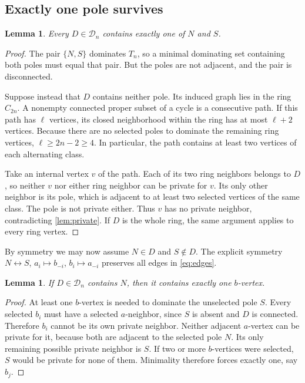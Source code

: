 \documentclass[11pt,letterpaper]{article}
\numberwithin{equation}{section}
\newtheorem{lemma}[theorem]{Lemma}
\theoremstyle{definition}
\newcommand{\CM}{\mathcal D}
\newcommand{\1}{\mathbf 1}
\begin{document}
\subsection{Exactly one pole survives}
\begin{lemma}\label{lem:onepole}
Every $D\in\CM_n$ contains exactly one of $N$ and $S$.
\end{lemma}
\begin{proof}
The pair $\{N,S\}$ dominates $T_n$, so a minimal dominating set containing
both poles must equal that pair. But the poles are not adjacent, and the pair
is disconnected.

Suppose instead that $D$ contains neither pole. Its induced graph lies in the
ring $C_{2n}$. A nonempty connected proper subset of a cycle is a consecutive
path. If this path has $\ell$ vertices, its closed neighborhood within the ring
has at most $\ell+2$ vertices. Because there are no selected poles to dominate
the remaining ring vertices, $\ell\ge2n-2\ge4$. In particular, the path contains
at least two vertices of each alternating class.

Take an internal vertex $v$ of the path. Each of its two ring neighbors belongs
to $D$, so neither $v$ nor either ring neighbor can be private for $v$. Its only
other neighbor is its pole, which is adjacent to at least two selected vertices
of the same class. The pole is not private either. Thus $v$ has no private
neighbor, contradicting \cref{lem:private}. If $D$ is the whole ring, the same
argument applies to every ring vertex.
\end{proof}

By symmetry we may now assume $N\in D$ and $S\notin D$. The explicit symmetry
$N\leftrightarrow S$, $a_i\mapsto b_{-i}$, $b_i\mapsto a_{-i}$ preserves all
edges in \eqref{eq:edges}.

\begin{lemma}\label{lem:oneb}
If $D\in\CM_n$ contains $N$, then it contains exactly one $b$-vertex.
\end{lemma}
\begin{proof}
At least one $b$-vertex is needed to dominate the unselected pole $S$.
Every selected $b_i$ must have a selected $a$-neighbor, since $S$ is absent and
$D$ is connected. Therefore $b_i$ cannot be its own private neighbor.
Neither adjacent $a$-vertex can be private for it, because both are adjacent
to the selected pole $N$. Its only remaining possible private neighbor is $S$.
If two or more $b$-vertices were selected, $S$ would be private for none of them.
Minimality therefore forces exactly one, say $b_j$.
\end{proof}
\end{document}
